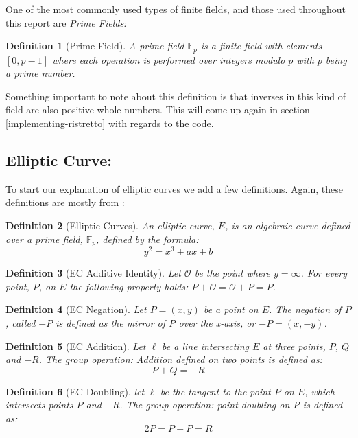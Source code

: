 \documentclass{article}
\newtheorem{definition}{Definition}[section]
\renewcommand{\O}{\mathcal{O}}
\newcommand{\F}{\mathbb{F}}
\begin{document}
One of the most commonly used types of finite fields, and those used
throughout this report are \textit{Prime Fields:} 

\begin{definition}[Prime Field]
	A prime field $\F_p$ is a finite field with elements $[0,p-1]$
	where each operation is performed over integers modulo $p$
	with $p$ being a prime number.
\end{definition}

Something important to note about this definition is that inverses in
this kind of field are also positive whole numbers. This will come up
again in section \ref{implementing-ristretto} with regards to the code.

\subsection{Elliptic Curve:}\label{elliptic-curves}

To start our explanation of elliptic curves we add a few
definitions. Again, these definitions are mostly from
\cite{elliptic-curves}:

\begin{definition}[Elliptic Curves]
	An elliptic curve, $E$, is an algebraic curve defined over a
	prime field, $\F_p$, defined by the formula:
	$$y^2 = x^3 + ax + b$$
\end{definition}

\begin{definition}[EC Additive Identity]
	Let $\O$ be the point where $y = \infty$. For every point, $P$,
	on $E$ the following property holds:
	$P + \O = \O + P = P$.
\end{definition}

\begin{definition}[EC Negation]
	Let $P = (x,y)$ be a point on $E$. The negation of $P$, called $-P$
	is defined as the mirror of P over the x-axis, or $-P = (x,-y)$.
\end{definition}

\begin{definition}[EC Addition]
	Let $\ell$ be a line intersecting $E$ at three points, $P$, $Q$ and
	$-R$. The group operation: Addition defined on two points is defined
	as:
	$$P + Q = {-R}$$
\end{definition}

\begin{definition}[EC Doubling]
	let $\ell$ be the tangent to the point $P$ on $E$, which intersects
	points $P$ and $-R$. The group operation: point doubling on P is
	defined as:
	$$2P = P + P = R$$
\end{definition}
\end{document}
